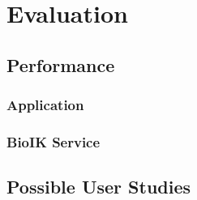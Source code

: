 \chapter{Evaluation}
\label{chap:eval}

\section{Performance}

\subsection{Application}

\subsection{BioIK Service}

\section{Possible User Studies}